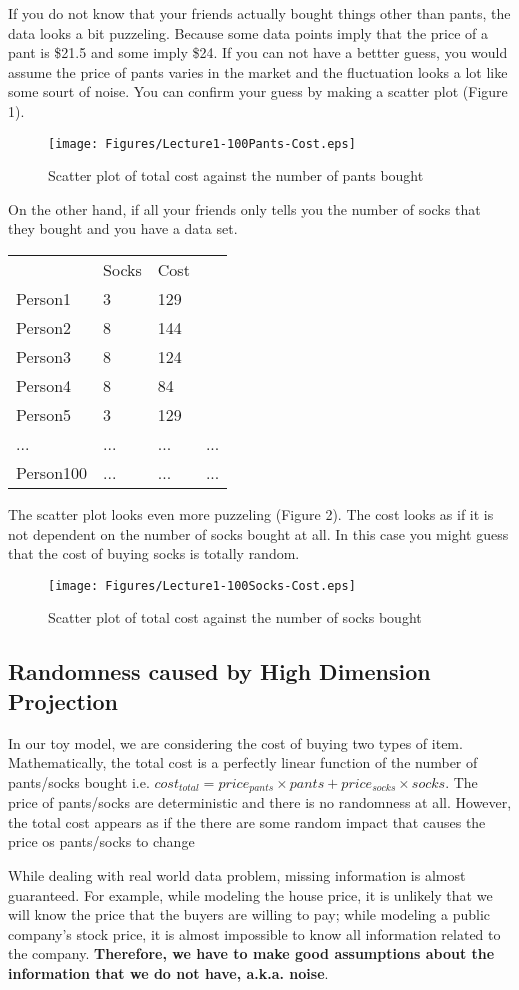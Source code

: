 \documentclass[12pt, oneside]{article}
\begin{document}
If you do not know that your friends actually bought things other than pants, the data looks a bit puzzeling. Because some data points imply that the price of a pant is \$21.5 and some imply \$24. If you can not have a bettter guess, you would assume the price of pants varies in the market and the fluctuation looks a lot like some sourt of noise. You can confirm your guess by making a scatter plot (Figure 1).

\begin{figure}
\center
\texttt{[image: Figures/Lecture1-100Pants-Cost.eps]}
\caption{Scatter plot of total cost against the number of pants bought}
\end{figure}

On the other hand, if all your friends only tells you the number of socks that they bought and you have a data set. 

\vspace{.1in}
\begin{tabular}{llll}
 &Socks   &Cost  \\
Person1 &3 &129\\
Person2 &8	&144\\
Person3 &8	&124\\
Person4 &8	&84\\
Person5 &3	&129\\
... & ... &... &...\\
Person100 & ...&...&...
\end{tabular}
\vspace{.1in}

The scatter plot looks even more puzzeling (Figure 2). The cost looks as if it is not dependent on the number of socks bought at all. In this case you might guess that the cost of buying socks is totally random.
\begin{figure}
\center
\texttt{[image: Figures/Lecture1-100Socks-Cost.eps]}
\caption{Scatter plot of total cost against the number of socks bought}
\end{figure}
\subsection{Randomness caused by High Dimension Projection }
In our toy model, we are considering the cost of buying two types of item. Mathematically, the total cost is a perfectly linear function of the number of pants/socks bought i.e. $cost_{total}=price_{pants} \times pants+ price_{socks} \times socks$. The price of pants/socks are deterministic and there is no randomness at all. However, the total cost appears as if the there are some random impact that causes the price os pants/socks to change

While dealing with real world data problem, missing information is almost guaranteed. For example, while modeling the house price, it is unlikely that we will know the price that the buyers are willing to pay; while modeling a public company's stock price, it is almost impossible to know all information related to the company. \textbf{Therefore, we have to make good assumptions about the information that we do not have, a.k.a. noise}. 
\end{document}
